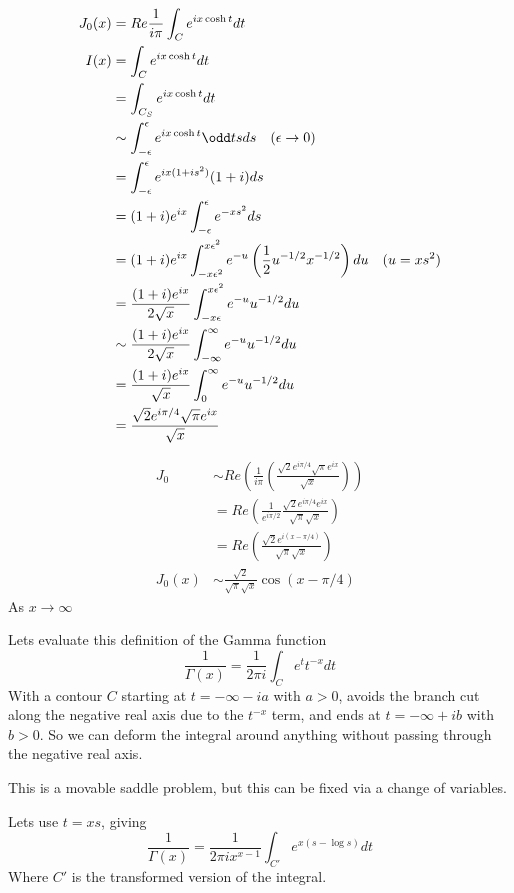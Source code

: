 \documentclass{X:/Documents/Coding/Latex/myassignment}
\begin{document}
\begin{align*}
    J_0(x) &= Re \frac1{i\pi} \int_C e^{ix\cosh t} dt\\
    I(x) &= \int_C e^{ix\cosh t} dt\\
    &= \int_{C_S} e^{ix\cosh t} dt\\
    &\sim \int_{-\epsilon}^\epsilon e^{ix\cosh t} \odd ts ds \quad (\epsilon\to 0)\\
    &= \int_{-\epsilon}^\epsilon e^{ix(1+is^2)} (1+i)ds\\
    &= (1+i)e^{ix}\int_{-\epsilon}^\epsilon e^{-xs^2} ds\\
    &= (1+i)e^{ix}\int_{-x\epsilon^2}^{x\epsilon^2} e^{-u}\left(\frac12 u^{-1/2} x^{-1/2}\right) du \quad (u=xs^2)\\
    &= \frac{(1+i)e^{ix}}{2\sqrt{x}} \int_{-x\epsilon}^{x\epsilon^2} e^{-u}u^{-1/2} du\\
    &\sim \frac{(1+i)e^{ix}}{2\sqrt{x}} \int_{-\infty}^{\infty} e^{-u}u^{-1/2} du\\
    &= \frac{(1+i)e^{ix}}{\sqrt{x}} \int_{0}^{\infty} e^{-u}u^{-1/2} du\\
    &=\frac{\sqrt{2} e^{i\pi/4} \sqrt{\pi}e^{ix}}{\sqrt{x}}\\
\end{align*}

\begin{align*}
    J_0 &\sim Re\left(\frac{1}{i\pi} \left(\frac{\sqrt{2} e^{i\pi/4} \sqrt{\pi}e^{ix}}{\sqrt{x}}\right)\right)\\
    &= Re\left(\frac{1}{e^{i\pi/2}} \frac{\sqrt{2}e^{i\pi/4}e^{ix}}{\sqrt\pi\sqrt{x}}\right)\\
    &= Re\left( \frac{\sqrt{2}e^{i(x-\pi/4)}}{\sqrt\pi\sqrt{x}}\right)\\
    J_0(x) &\sim \frac{\sqrt{2}}{\sqrt{\pi}\sqrt{x}} \cos(x-\pi/4)
\end{align*}
As $x\to\infty$


Lets evaluate this definition of the Gamma function
\[\frac1{\Gamma(x)} = \frac{1}{2\pi i} \int_C e^t t^{-x} dt\]
With a contour $C$ starting at $t = -\infty -ia$ with $a>0$, avoids the branch cut along the negative real axis due to the $t^{-x}$ term, and ends at $t = -\infty + ib$ with $b >0$.
So we can deform the integral around anything without passing through the negative real axis.

This is a movable saddle problem, but this can be fixed via a change of variables.

Lets use $t=xs$, giving
\[\frac1{\Gamma(x)} = \frac{1}{2\pi i x^{x-1}} \int_{C'} e^{x(s-\log s)} dt\]
Where $C'$ is the transformed version of the integral.
\end{document}
